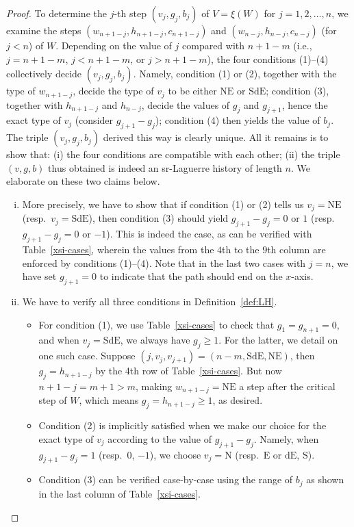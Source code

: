 \documentclass[12pt]{amsart}
\numberwithin{equation}{section}
\theoremstyle{plain}
\theoremstyle{definition}
\def\N{\mathrm{N}}
\def\S{\mathrm{S}}
\def\E{\mathrm{E}}
\def\dE{\mathrm{dE}}
\def\NE{\mathrm{NE}}
\def\SdE{\mathrm{SdE}}
\begin{document}
\begin{proof}
To determine the $j$-th step $(v_j,g_j,b_j)$ of $V=\xi(W)$ for $j=1,2,\ldots,n$, we examine the steps $(w_{n+1-j},h_{n+1-j},c_{n+1-j})$ and $(w_{n-j},h_{n-j},c_{n-j})$ (for $j<n$) of $W$. Depending on the value of $j$ compared with $n+1-m$ (i.e., $j=n+1-m$, $j<n+1-m$, or $j>n+1-m$), the four conditions (1)--(4) collectively decide $(v_j,g_j,b_j)$. Namely, condition (1) or (2), together with the type of $w_{n+1-j}$, decide the type of $v_j$ to be either $\NE$ or $\SdE$; condition (3), together with $h_{n+1-j}$ and $h_{n-j}$, decide the values of $g_j$ and $g_{j+1}$, hence the exact type of $v_j$ (consider $g_{j+1}-g_j$); condition (4) then yields the value of $b_j$. The triple $(v_j,g_j,b_j)$ derived this way is clearly unique. All it remains is to show that: (i) the four conditions are compatible with each other; (ii) the triple $(v,g,b)$ thus obtained is indeed an sr-Laguerre history of length $n$. We elaborate on these two claims below.
\begin{enumerate}[(i)]
	\item More precisely, we have to show that if condition (1) or (2) tells us $v_j=\NE$ (resp.~$v_j=\SdE$), then condition (3) should yield $g_{j+1}-g_j = 0$ or $1$ (resp.~$g_{j+1}-g_j = 0$ or $-1$). This is indeed the case, as can be verified with Table~\ref{xsi-cases}, wherein the values from the $4$th to the $9$th column are enforced by conditions (1)--(4). Note that in the last two cases with $j=n$, we have set $g_{j+1}=0$ to indicate that the path should end on the $x$-axis.
	\item We have to verify all three conditions in Definition~\ref{def:LH}.
	\begin{itemize}
		\item[(ii-1)] For condition (1), we use Table~\ref{xsi-cases} to check that $g_1=g_{n+1}=0$, and when $v_j=\SdE$, we always have $g_j\ge 1$. For the latter, we detail on one such case. Suppose $(j,v_j,v_{j+1})=(n-m,\SdE,\NE)$, then $g_j=h_{n+1-j}$ by the 4th row of Table~\ref{xsi-cases}. But now $n+1-j=m+1>m$, making $w_{n+1-j}=\NE$ a step after the critical step of $W$, which means $g_j=h_{n+1-j}\ge 1$, as desired.
		\item[(ii-2)] Condition (2) is implicitly satisfied when we make our choice for the exact type of $v_j$ according to the value of $g_{j+1}-g_j$. Namely, when $g_{j+1}-g_j=1$ (resp.~$0$, $-1$), we choose $v_j=\N$ (resp.~$\E$ or $\dE$, $\S$).
		\item[(ii-3)] Condition (3) can be verified case-by-case using the range of $b_j$ as shown in the last column of Table~\ref{xsi-cases}.
	\end{itemize}
\end{enumerate}


\end{proof}
\end{document}
